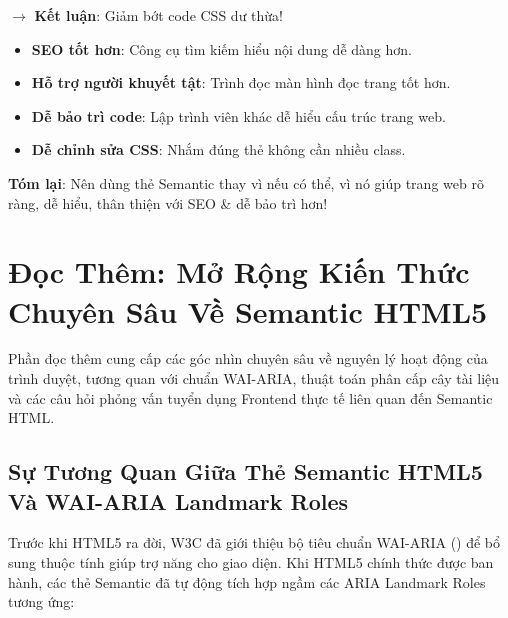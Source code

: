 \begin{center}
$\rightarrow$ \textbf{Kết luận}: Giảm bớt code CSS dư thừa!
\end{center}

\begin{noteBox}
\begin{itemize}[leftmargin=1.5em, itemsep=3pt, parsep=0pt]
    \item \textbf{SEO tốt hơn}: Công cụ tìm kiếm hiểu nội dung dễ dàng hơn.
    \item \textbf{Hỗ trợ người khuyết tật}: Trình đọc màn hình đọc trang tốt hơn.
    \item \textbf{Dễ bảo trì code}: Lập trình viên khác dễ hiểu cấu trúc trang web.
    \item \textbf{Dễ chỉnh sửa CSS}: Nhắm đúng thẻ không cần nhiều class.
\end{itemize}
\textbf{Tóm lại}: Nên dùng thẻ Semantic thay vì  nếu có thể, vì nó giúp trang web rõ ràng, dễ hiểu, thân thiện với SEO \& dễ bảo trì hơn!
\end{noteBox}

\Needspace*{120pt}
\section{Đọc Thêm: Mở Rộng Kiến Thức Chuyên Sâu Về Semantic HTML5}
\label{sec:semantic_html5_advanced_readmore}

Phần đọc thêm cung cấp các góc nhìn chuyên sâu về nguyên lý hoạt động của trình duyệt, tương quan với chuẩn WAI-ARIA, thuật toán phân cấp cây tài liệu và các câu hỏi phỏng vấn tuyển dụng Frontend thực tế liên quan đến Semantic HTML.

\subsection{Sự Tương Quan Giữa Thẻ Semantic HTML5 Và WAI-ARIA Landmark Roles}

Trước khi HTML5 ra đời, W3C đã giới thiệu bộ tiêu chuẩn WAI-ARIA () để bổ sung thuộc tính  giúp trợ năng cho giao diện. Khi HTML5 chính thức được ban hành, các thẻ Semantic đã tự động tích hợp ngầm các ARIA Landmark Roles tương ứng:

